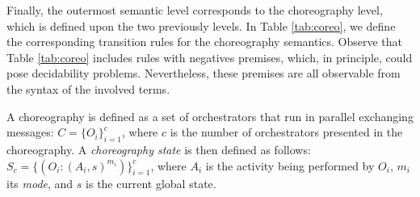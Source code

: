 \begin{table}[!ht]
\centering
{\scriptsize
{}}
\caption{\label{tab:noti}Action and delay transition rules for orchestrators.}
\end{table}


Finally, the outermost semantic level corresponds to the choreography level, which is defined upon the two previously levels. In Table \ref{tab:coreo}, we define the corresponding transition rules for the choreography semantics. Observe that Table \ref{tab:coreo} includes rules with negatives premises, which, in principle, could pose decidability problems. Nevertheless, these premises are all observable from the syntax of the involved terms.

\begin{definition}
A choreography is defined as a set of orchestrators that run in parallel exchanging messages: $C=\{O_i\}_{i=1}^c$, where $c$ is the number of orchestrators
presented in the choreography. A {\it choreography state} is then defined as follows:
$S_c=\{(O_i:(A_i, s)^{m_i})\}_{i=1}^c$, where $A_i$ is the activity being performed by $O_i$, $m_{i}$ its \emph{mode}, and $s$ is the current global state.
\vspace{0.1cm}
\end{definition}

